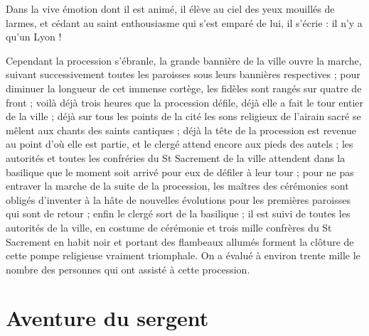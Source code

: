 \documentclass[11pt,a4paper]{report}
\begin{document}
Dans la vive émotion dont il est animé, il élève au ciel des yeux mouillés de larmes, et cédant au saint enthousiasme qui s'est emparé de lui, il s'écrie : il n'y a qu'un Lyon !

Cependant la procession s'ébranle, la grande bannière de la ville ouvre la marche, suivant successivement toutes les paroisses sous leurs bannières respectives ; pour diminuer la longueur de cet immense cortège, les fidèles sont rangés sur quatre de front ; voilà déjà trois heures que la procession défile, déjà elle a fait le tour entier de la ville ; déjà sur tous les points de la cité les sons religieux de l'airain sacré se mêlent aux chants des saints cantiques ; déjà la tête de la procession est revenue au point d'où elle est partie, et le clergé attend encore aux pieds des autels ; les autorités et toutes les confréries du St Sacrement de la ville attendent dans la basilique que le moment soit arrivé pour eux de défiler à leur tour ; pour ne pas entraver la marche de la suite de la procession, les maîtres des cérémonies sont obligés d'inventer à la hâte de nouvelles évolutions pour les premières paroisses qui sont de retour ; enfin le clergé sort de la basilique ; il est suivi de toutes les autorités de la ville, en costume de cérémonie et trois mille confrères du St Sacrement en habit noir et portant des flambeaux allumés forment la clôture de cette pompe religieuse vraiment triomphale. On a évalué à environ trente mille le nombre des personnes qui ont assisté à cette procession.

\section*{Aventure du sergent}
\end{document}
